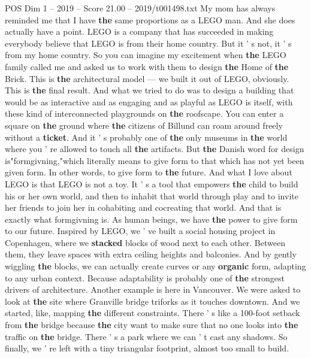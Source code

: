 \begin{textsample}{POS Dim 1 – 2019 – Score 21.00 – 2019/t001498.txt}  \label{ex:f1_pos_057}
My mom has always reminded me that I have \textbf{the} same proportions as a LEGO man.
And she does actually have a point.
LEGO is a company that has succeeded in making everybody believe that LEGO is from their home country.
But it ' s not, it ' s from my home country.
So you can imagine my excitement when \textbf{the} LEGO family called me and asked us to work with them to design \textbf{the} Home of \textbf{the} Brick.
This is \textbf{the} architectural model — we built it out of LEGO, obviously.
This is \textbf{the} final result.
And what we tried to do was to design a building that would be as interactive and as engaging and as playful as LEGO is itself, with these kind of interconnected playgrounds on \textbf{the} roofscape.
You can enter a square on \textbf{the} ground where \textbf{the} citizens of Billund can roam around freely without a \textbf{ticket}.
And it ' s probably one of \textbf{the} only museums in \textbf{the} world where you ' re allowed to touch all \textbf{the} artifacts.
But \textbf{the} Danish word for design is"formgivning,"which literally means to give form to that which has not yet been given form.
In other words, to give form to \textbf{the} future.
And what I love about LEGO is that LEGO is not a toy.
It ' s a tool that empowers \textbf{the} child to build his or her own world, and then to inhabit that world through play and to invite her friends to join her in cohabiting and cocreating that world.
And that is exactly what formgivning is.
As human beings, we have \textbf{the} power to give form to our future.
Inspired by LEGO, we ' ve built a social housing project in Copenhagen, where we \textbf{stacked} blocks of wood next to each other.
Between them, they leave spaces with extra ceiling heights and balconies.
And by gently wiggling \textbf{the} blocks, we can actually create curves or any \textbf{organic} form, adapting to any urban context.
Because adaptability is probably one of \textbf{the} strongest drivers of architecture.
Another example is here in Vancouver.
We were asked to look at \textbf{the} site where Granville bridge triforks as it touches downtown.
And we started, like, mapping \textbf{the} different constraints.
There ' s like a 100-foot setback from \textbf{the} bridge because \textbf{the} city want to make sure that no one looks into \textbf{the} traffic on \textbf{the} bridge.
There ' s a park where we can ' t cast any shadows.
So finally, we ' re left with a tiny triangular footprint, almost too small to build.

\end{textsample}
